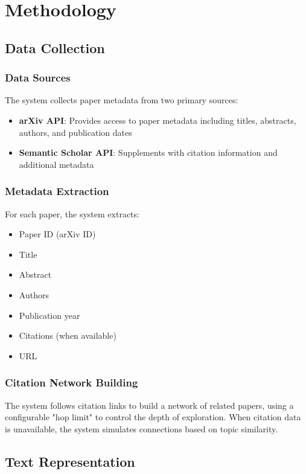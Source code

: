 \documentclass[11pt,a4paper]{article}
\begin{document}
\section{Methodology}

\subsection{Data Collection}

\subsubsection{Data Sources}
The system collects paper metadata from two primary sources:
\begin{itemize}
    \item \textbf{arXiv API}: Provides access to paper metadata including titles, abstracts, authors, and publication dates
    \item \textbf{Semantic Scholar API}: Supplements with citation information and additional metadata
\end{itemize}

\subsubsection{Metadata Extraction}
For each paper, the system extracts:
\begin{itemize}
    \item Paper ID (arXiv ID)
    \item Title
    \item Abstract
    \item Authors
    \item Publication year
    \item Citations (when available)
    \item URL
\end{itemize}

\subsubsection{Citation Network Building}
The system follows citation links to build a network of related papers, using a configurable "hop limit" to control the depth of exploration. When citation data is unavailable, the system simulates connections based on topic similarity.

\subsection{Text Representation}
\end{document}
